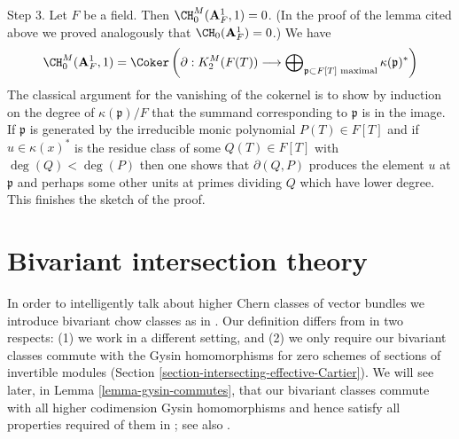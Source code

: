 \begin{remark}
\medskip\noindent
Step 3. Let $F$ be a field. Then $\CH^M_0(\mathbf{A}^1_F, 1) = 0$.
(In the proof of the lemma cited above we proved analogously that
$\CH_0(\mathbf{A}^1_F) = 0$.) We have
$$
\CH^M_0(\mathbf{A}^1_F, 1) = \Coker\left(
\partial : K^M_2(F(T)) \longrightarrow
\bigoplus\nolimits_{\mathfrak p \subset F[T]\text{ maximal}}
\kappa(\mathfrak p)^*\right)
$$
The classical argument for the vanishing of the cokernel is to
show by induction on the degree of $\kappa(\mathfrak p)/F$
that the summand corresponding to $\mathfrak p$ is in the image.
If $\mathfrak p$ is generated by the
irreducible monic polynomial $P(T) \in F[T]$ and if
$u \in \kappa(x)^*$ is the residue class of some
$Q(T) \in F[T]$ with $\deg(Q) < \deg(P)$ then one shows that
$\partial(Q, P)$ produces the element $u$ at $\mathfrak p$
and perhaps some other units at primes dividing $Q$ which
have lower degree. This finishes the sketch of the proof.
\end{remark}











\section{Bivariant intersection theory}
\label{section-bivariant}

\noindent
In order to intelligently talk about higher Chern classes of vector
bundles we introduce bivariant chow classes as in \cite{F}.
Our definition differs from \cite{F} in two respects:
(1) we work in a different setting, and (2) we only require
our bivariant classes commute with the Gysin homomorphisms for
zero schemes of sections of invertible modules
(Section \ref{section-intersecting-effective-Cartier}).
We will see later, in Lemma \ref{lemma-gysin-commutes}, that our
bivariant classes commute with all higher codimension Gysin homomorphisms
and hence satisfy all properties required of them in \cite{F}; see
also \cite[Theorem 17.1]{F}.

